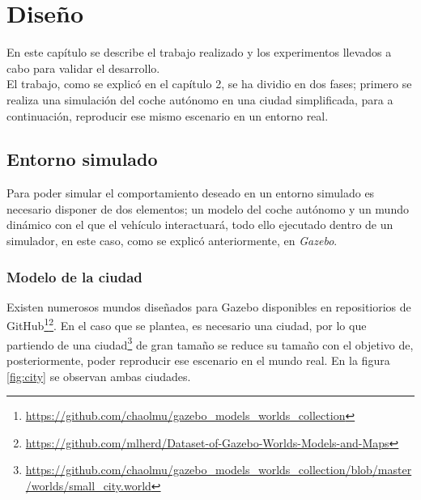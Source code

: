 \chapter{Diseño}
\label{cap:capitulo4}

En este capítulo se describe el trabajo realizado y los experimentos llevados a cabo para validar el desarrollo.\\

El trabajo, como se explicó en el capítulo 2, se ha dividio en dos fases; primero se realiza una simulación del coche autónomo en una ciudad simplificada, para a continuación, reproducir ese mismo escenario en un entorno real.\\

\section{Entorno simulado}
Para poder simular el comportamiento deseado en un entorno simulado es necesario disponer de dos elementos; un modelo del coche autónomo y un mundo dinámico con el que el vehículo interactuará, todo ello ejecutado dentro de un simulador, en este caso, como se explicó anteriormente, en \textit{Gazebo}.\\

\subsection{Modelo de la ciudad}
Existen numerosos mundos diseñados para Gazebo disponibles en repositiorios de GitHub\footnote{\url{https://github.com/chaolmu/gazebo_models_worlds_collection}}\footnote{\url{https://github.com/mlherd/Dataset-of-Gazebo-Worlds-Models-and-Maps}}. En el caso que se plantea, es necesario una ciudad, por lo que partiendo de una ciudad\footnote{\url{https://github.com/chaolmu/gazebo_models_worlds_collection/blob/master/worlds/small_city.world}} de gran tamaño se reduce su tamaño con el objetivo de, posteriormente, poder reproducir ese escenario en el mundo real. En la figura \ref{fig:city} se observan ambas ciudades.\\

